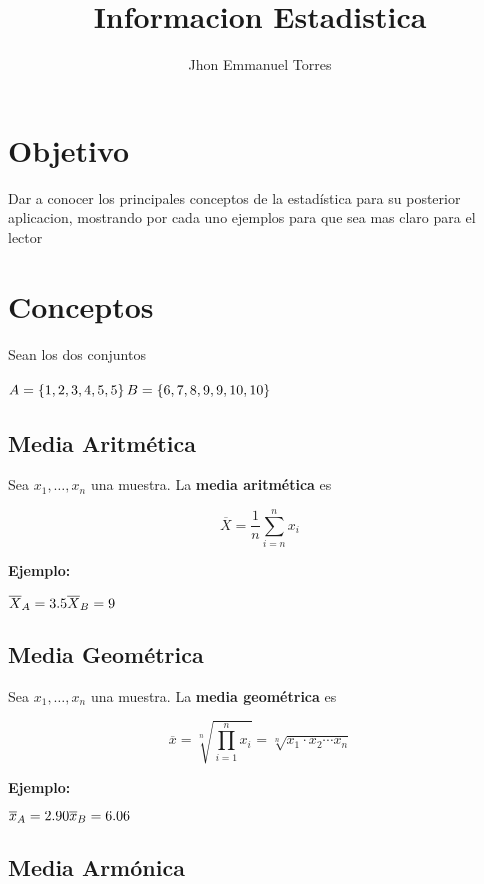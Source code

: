 \documentclass[10pt,a4paper]{article}
\title{Informacion Estadistica}
\date{}
\author{Jhon Emmanuel Torres}
\begin{document}
\maketitle
\section{Objetivo}
Dar a conocer los principales conceptos de la estadística para su posterior aplicacion, mostrando por cada uno ejemplos para que sea mas claro para el lector

\section{Conceptos}
Sean los dos conjuntos\\\\
$
A = \left\lbrace  1, 2, 3, 4, 5, 5 \right\rbrace \\
B = \left\lbrace  6, 7, 8, 9, 9, 10, 10 \right\rbrace  
$

\subsection{Media Aritmética}
Sea $x_{1}, \ldots,x_{n}$ una muestra. La \textbf{media aritmética} es

$$ \overline{X} = \dfrac{1}{n} \sum_{i = n}^{n}x_{i} $$
\begin{flushleft}
\textbf{Ejemplo:}
\end{flushleft}
$
\overline{X}_{A} = 3.5\\
\overline{X}_{B} = 9
$

\subsection{Media Geométrica}

Sea $x_{1}, \ldots,x_{n}$ una muestra. La \textbf{media geométrica} es

$$ \overline{x} = \sqrt[n]{\prod_{i = 1}^{n} x_i } = \sqrt[n]{x_1\cdot x_2 \cdots x_n }
 $$

\begin{flushleft}
	\textbf{Ejemplo:}
\end{flushleft}
$
\overline{x}_{A} = 2.90\\
\overline{x}_{B} = 6.06
$



\subsection{Media Armónica}
\end{document}
